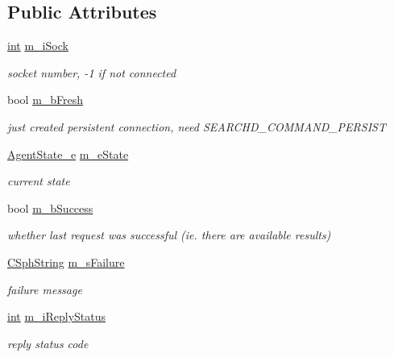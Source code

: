 \subsection*{Public Attributes}
\begin{DoxyCompactItemize}
\item 
\hyperlink{sphinxexpr_8cpp_a4a26e8f9cb8b736e0c4cbf4d16de985e}{int} \hyperlink{structAgentConn__t_a839dd9a3b8c453d19a350c2c319cc9e0}{m\-\_\-i\-Sock}
\begin{DoxyCompactList}\small\item\em socket number, -\/1 if not connected \end{DoxyCompactList}\item 
bool \hyperlink{structAgentConn__t_aacc0fc32c87a655ee731944c096198d6}{m\-\_\-b\-Fresh}
\begin{DoxyCompactList}\small\item\em just created persistent connection, need S\-E\-A\-R\-C\-H\-D\-\_\-\-C\-O\-M\-M\-A\-N\-D\-\_\-\-P\-E\-R\-S\-I\-S\-T \end{DoxyCompactList}\item 
\hyperlink{searchdha_8h_aacf8321964d37cbf1de1f483bba94939}{Agent\-State\-\_\-e} \hyperlink{structAgentConn__t_a1b1c48b4720544ea723a0d27f604c422}{m\-\_\-e\-State}
\begin{DoxyCompactList}\small\item\em current state \end{DoxyCompactList}\item 
bool \hyperlink{structAgentConn__t_a7668be7cb46253022088332a4e1e45da}{m\-\_\-b\-Success}
\begin{DoxyCompactList}\small\item\em whether last request was successful (ie. there are available results) \end{DoxyCompactList}\item 
\hyperlink{structCSphString}{C\-Sph\-String} \hyperlink{structAgentConn__t_a90c41f9dede2f2db77525cc0f3668042}{m\-\_\-s\-Failure}
\begin{DoxyCompactList}\small\item\em failure message \end{DoxyCompactList}\item 
\hyperlink{sphinxexpr_8cpp_a4a26e8f9cb8b736e0c4cbf4d16de985e}{int} \hyperlink{structAgentConn__t_a3aea30ff4e6deae995a681bdf4b5a504}{m\-\_\-i\-Reply\-Status}
\begin{DoxyCompactList}\small\item\em reply status code \end{DoxyCompactList}\item 

\end{DoxyCompactItemize}
